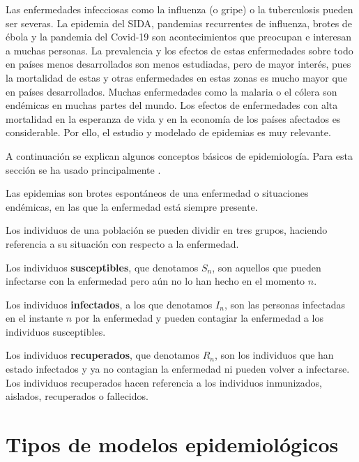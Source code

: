 Las enfermedades infecciosas como la influenza (o gripe) o la tuberculosis pueden ser severas. La epidemia del SIDA, pandemias recurrentes de influenza, brotes de ébola y la pandemia del Covid-19 son acontecimientos que preocupan e interesan a muchas personas. La prevalencia y los efectos de estas enfermedades sobre todo en países menos desarrollados son menos estudiadas, pero de mayor interés, pues la mortalidad de estas y otras enfermedades en estas zonas es mucho mayor que en países desarrollados. Muchas enfermedades como la malaria o el cólera son endémicas en muchas partes del mundo. Los efectos de enfermedades con alta mortalidad en la esperanza de vida y en la economía de los países afectados es considerable. Por ello, el estudio y modelado de epidemias es muy relevante.

A continuación se explican algunos conceptos básicos de epidemiología. Para esta sección se ha usado principalmente \cite{brauerMathematicalModelsPopulation2012}.

\begin{definition}
Las epidemias son brotes espontáneos de una enfermedad o situaciones endémicas, en las que la enfermedad está siempre presente.
\end{definition}

Los individuos de una población se pueden dividir en tres grupos, haciendo referencia a su situación con respecto a la enfermedad.

\begin{definition}
Los individuos \textbf{susceptibles}, que denotamos $S_n$, son aquellos que pueden infectarse con la enfermedad pero aún no lo han hecho en el momento $n$.
\end{definition}

\begin{definition}
Los individuos \textbf{infectados}, a los que denotamos $I_n$, son las personas infectadas en el instante $n$ por la enfermedad y pueden contagiar la enfermedad a los individuos susceptibles.
\end{definition}

\begin{definition}
Los individuos \textbf{recuperados}, que denotamos $R_n$, son los individuos que han estado infectados y ya no contagian la enfermedad ni pueden volver a infectarse.
Los individuos recuperados hacen referencia a los individuos inmunizados, aislados, recuperados o fallecidos.
\end{definition}

\section{Tipos de modelos epidemiológicos}

